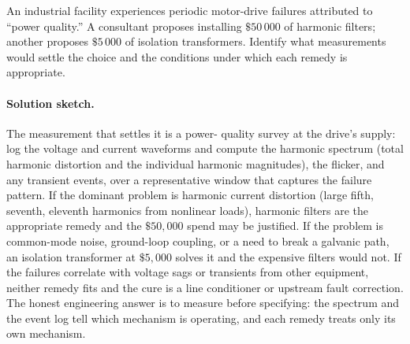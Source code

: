 \begin{exercise}
An industrial facility experiences periodic motor-drive failures
attributed to ``power quality.'' A consultant proposes installing
$\$50\,000$ of harmonic filters; another proposes $\$5\,000$ of
isolation transformers. Identify what measurements would settle the
choice and the conditions under which each remedy is appropriate.

\paragraph{Solution sketch.} The measurement that settles it is a power-
quality survey at the drive's supply: log the voltage and current
waveforms and compute the harmonic spectrum (total harmonic distortion
and the individual harmonic magnitudes), the flicker, and any transient
events, over a representative window that captures the failure pattern.
If the dominant problem is harmonic current distortion (large fifth,
seventh, eleventh harmonics from nonlinear loads), harmonic filters are
the appropriate remedy and the $\$50{,}000$ spend may be justified. If
the problem is common-mode noise, ground-loop coupling, or a need to
break a galvanic path, an isolation transformer at $\$5{,}000$ solves it
and the expensive filters would not. If the failures correlate with
voltage sags or transients from other equipment, neither remedy fits and
the cure is a line conditioner or upstream fault correction. The honest
engineering answer is to measure before specifying: the spectrum and the
event log tell which mechanism is operating, and each remedy treats only
its own mechanism.
\end{exercise}
